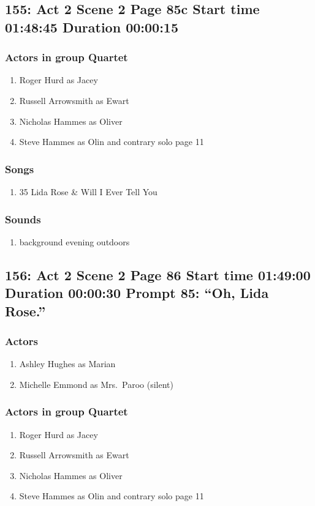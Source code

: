\subsection{155: Act 2 Scene 2 Page 85c Start time 01:48:45 Duration 00:00:15}

\subsubsection{Actors in group Quartet}
\begin{enumerate}
\item Roger Hurd as Jacey
\item Russell Arrowsmith as Ewart
\item Nicholas Hammes as Oliver
\item Steve Hammes as Olin and contrary solo page 11
\end{enumerate}

\subsubsection{Songs}
\begin{enumerate}
\item 35 Lida Rose \& Will I Ever Tell You
\end{enumerate}\subsubsection{Sounds}
\begin{enumerate}
\item background evening outdoors
\end{enumerate}
\subsection{156: Act 2 Scene 2 Page 86 Start time 01:49:00 Duration 00:00:30 Prompt 85: ``Oh, Lida Rose.''}

\subsubsection{Actors}
\begin{enumerate}
\item Ashley Hughes as Marian
\item Michelle Emmond as Mrs.~Paroo (silent)
\end{enumerate}
\subsubsection{Actors in group Quartet}
\begin{enumerate}
\item Roger Hurd as Jacey
\item Russell Arrowsmith as Ewart
\item Nicholas Hammes as Oliver
\item Steve Hammes as Olin and contrary solo page 11
\end{enumerate}

